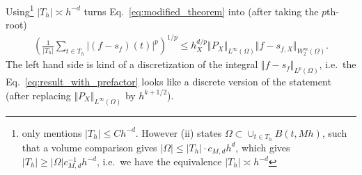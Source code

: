\documentclass[a4paper, 10pt]{article}
\begin{document}
\begin{rem}
Using\footnote{\cite[Lemma 2]{wendland1997sobolev} only mentions $|T_h| \leq C h^{-d}$. 
However \cite[Lemma 2]{wendland1997sobolev} (ii) states $\Omega \subset \cup_{t \in T_h} B(t, Mh)$, such that a volume comparison gives $|\Omega| \leq |T_h| \cdot c_{M,d} h^d$, which gives $|T_h| \geq |\Omega| c_{M,d}^{-1} h^{-d}$, i.e.\ we have the equivalence $|T_h| \asymp h^{-d}$} $|T_h| \asymp h^{-d}$
turns Eq.\ \eqref{eq:modified_theorem} into (after taking the $p$th-root)
\begin{align}
\label{eq:result_with_prefactor}
\left( \frac{1}{|T_h|} \sum_{t \in T_h} | (f-s_f)(t)|^p \right)^{1/p} \leq h_X^{d/p} \Vert P_{X} \Vert_{L^\infty(\Omega)} \Vert f - s_{f, X} \Vert_{W_2^m(\Omega)}.
\end{align}
The left hand side is kind of a discretization of the integral $\Vert f - s_f \Vert_{L^p(\Omega)}$, i.e.\ the Eq.\ \eqref{eq:result_with_prefactor} looks like a discrete version of the statement \cite[Theorem 5]{wendland1997sobolev} (after replacing $\Vert P_X \Vert_{L^\infty(\Omega)}$ by $h^{k + 1/2}$).
\end{rem}
\end{document}
